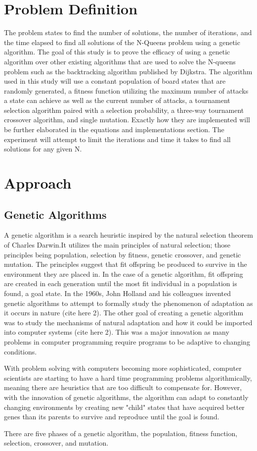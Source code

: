 \documentclass{vgtc}                          %
\begin{document}
\section{Problem Definition}
The problem states to find the number of solutions, the number of iterations, and the time elapsed to find all solutions of the N-Queens problem using a genetic algorithm. The goal of this study is to prove the efficacy of using a genetic algorithm over other existing algorithms that are used to solve the N-queens problem such as the backtracking algorithm published by Dijkstra. The algorithm used in this study will use a constant population of board states that are randomly generated, a fitness function utilizing the maximum number of attacks a state can achieve as well as the current number of attacks, a tournament selection algorithm paired with a selection probability, a three-way tournament crossover algorithm, and single mutation. Exactly how they are implemented will be further elaborated in the equations and implementations section. The experiment will attempt to limit the iterations and time it takes to find all solutions for any given N.  


\section{Approach}
\subsection{Genetic Algorithms}
A genetic algorithm is a search heuristic inspired by the natural selection theorem of Charles Darwin.It utilizes the main principles of natural selection; those principles being population, selection by fitness, genetic crossover, and genetic mutation. The principles suggest that fit offspring be produced to survive in the environment they are placed in. In the case of a genetic algorithm, fit offspring are created in each generation until the most fit individual in a population is found, a goal state. In the 1960s, John Holland and his colleagues invented genetic algorithms to attempt to formally study the phenomenon of adaptation as it occurs in nature (cite here 2). The other goal of creating a genetic algorithm was to study the mechanisms of natural adaptation and how it could be imported into computer systems (cite here 2). This was a major innovation as many problems in computer programming require programs to be adaptive to changing conditions. \par With problem solving with computers becoming more sophisticated, computer scientists are starting to have a hard time programming problems algorithmically, meaning there are heuristics that are too difficult to compensate for. However, with the innovation of genetic algorithms, the algorithm can adapt to constantly changing environments by creating new "child" states that have acquired better genes than its parents to survive and reproduce until the goal is found. \par There are five phases of a genetic algorithm, the population, fitness function, selection, crossover, and mutation.\\ 
\end{document}
